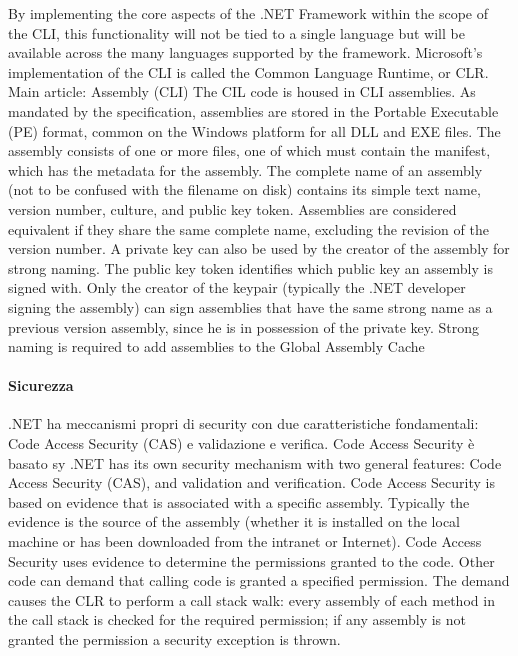 By implementing the core aspects of the .NET Framework within the scope of the CLI, this functionality will not be tied to a single language but will be available across the many languages supported by the framework. Microsoft's implementation of the CLI is called the Common Language Runtime, or CLR.
Main article: Assembly (CLI)
The CIL code is housed in CLI assemblies. As mandated by the specification, assemblies are stored in the Portable Executable (PE) format, common on the Windows platform for all DLL and EXE files. The assembly consists of one or more files, one of which must contain the manifest, which has the metadata for the assembly. The complete name of an assembly (not to be confused with the filename on disk) contains its simple text name, version number, culture, and public key token. Assemblies are considered equivalent if they share the same complete name, excluding the revision of the version number. A private key can also be used by the creator of the assembly for strong naming. The public key token identifies which public key an assembly is signed with. Only the creator of the keypair (typically the .NET developer signing the assembly) can sign assemblies that have the same strong name as a previous version assembly, since he is in possession of the private key. Strong naming is required to add assemblies to the Global Assembly Cache

\paragraph{Sicurezza}
.NET ha meccanismi propri di security con due caratteristiche fondamentali: Code Access Security (CAS) e validazione e verifica.
Code Access Security è basato sy
.NET has its own security mechanism with two general features: Code Access Security (CAS), and validation and verification. Code Access Security is based on evidence that is associated with a specific assembly. Typically the evidence is the source of the assembly (whether it is installed on the local machine or has been downloaded from the intranet or Internet). Code Access Security uses evidence to determine the permissions granted to the code. Other code can demand that calling code is granted a specified permission. The demand causes the CLR to perform a call stack walk: every assembly of each method in the call stack is checked for the required permission; if any assembly is not granted the permission a security exception is thrown.
